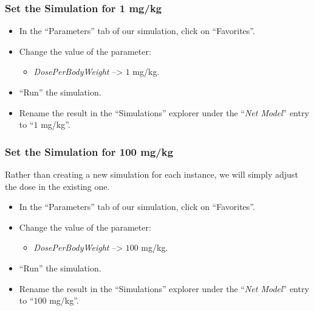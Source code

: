\documentclass[fleqn,10pt]{physiome}
\begin{document}
\subsubsection{Set the Simulation for 1 mg/kg}
\begin{itemize}
    \item In the ``Parameters'' tab of our simulation, click on ``Favorites''.
    \item Change the value of the parameter: 
    \begin{itemize}
        \item \textit{DosePerBodyWeight} --> $1$ mg/kg.
    \end{itemize}
    \item ``Run'' the simulation.
    \item Rename the result in the ``Simulations'' explorer under the ``\textit{Net Model}'' entry to ``$1$ mg/kg''.
\end{itemize}

\subsubsection{Set the Simulation for 100 mg/kg}
Rather than creating a new simulation for each instance, we will simply adjust the dose in the existing one.
\begin{itemize}
    \item In the ``Parameters'' tab of our simulation, click on ``Favorites''.
    \item Change the value of the parameter: 
    \begin{itemize}
        \item \textit{DosePerBodyWeight} --> $100$ mg/kg.
    \end{itemize}
    \item ``Run'' the simulation.
    \item Rename the result in the ``Simulations'' explorer under the ``\textit{Net Model}'' entry to ``$100$ mg/kg''.
\end{itemize}
\end{document}
